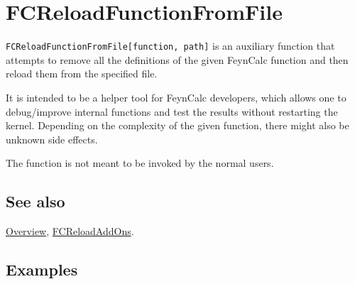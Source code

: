\documentclass[../FeynCalcManual.tex]{subfiles}
\begin{document}
\hypertarget{fcreloadfunctionfromfile}{
\section{FCReloadFunctionFromFile}\label{fcreloadfunctionfromfile}}

\texttt{FCReloadFunctionFromFile[\allowbreak{}function,\ \allowbreak{}path]}
is an auxiliary function that attempts to remove all the definitions of
the given FeynCalc function and then reload them from the specified
file.

It is intended to be a helper tool for FeynCalc developers, which allows
one to debug/improve internal functions and test the results without
restarting the kernel. Depending on the complexity of the given
function, there might also be unknown side effects.

The function is not meant to be invoked by the normal users.

\subsection{See also}

\hyperlink{toc}{Overview}, \hyperlink{fcreloadaddons}{FCReloadAddOns}.

\subsection{Examples}
\end{document}
